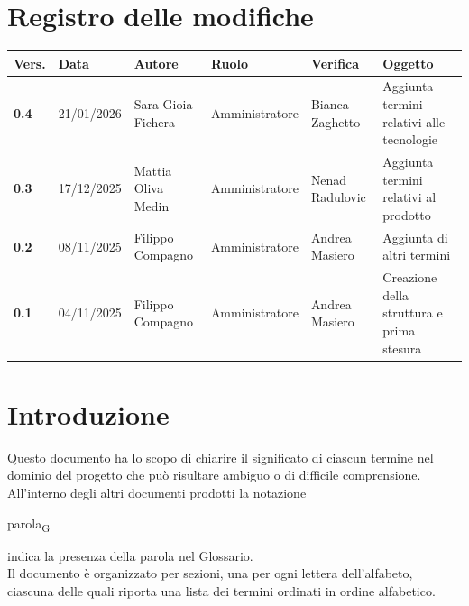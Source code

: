 \documentclass[a4paper,12pt]{article}
\begin{document}
    

        \newpage
        \section*{Registro delle modifiche} {
        \begin{table}[h!]
            \begin{tabularx}{\textwidth}{|l|l|l|l|L|L|}
                \hline
                \textbf{Vers.} & \textbf{Data} & \textbf{Autore} & \textbf{Ruolo} & \textbf{Verifica} & \textbf{Oggetto} \\
                \hline
                \textbf{0.4} & 21/01/2026 & Sara Gioia Fichera & Amministratore & Bianca Zaghetto & Aggiunta termini relativi alle tecnologie \\
                \hline
                \textbf{0.3} & 17/12/2025 & Mattia Oliva Medin & Amministratore & Nenad Radulovic & Aggiunta termini relativi al prodotto \\
                \hline
                \textbf{0.2} & 08/11/2025 & Filippo Compagno & Amministratore & Andrea Masiero & Aggiunta di altri termini \\
                \hline
                \textbf{0.1} & 04/11/2025 & Filippo Compagno & Amministratore & Andrea Masiero & Creazione della struttura e prima stesura \\
                \hline
            \end{tabularx}
            \end{table}
        }
        \newpage

        \tableofcontents
        \newpage

        \section*{Introduzione} {
            Questo documento ha lo scopo di chiarire il significato di ciascun termine nel dominio del progetto che può risultare ambiguo o di difficile comprensione.\\
            All'interno degli altri documenti prodotti la notazione
            \begin{center}
                parola\textsubscript{G}
            \end{center}
            indica la presenza della parola nel Glossario.\\
            Il documento è organizzato per sezioni, una per ogni lettera dell'alfabeto, ciascuna delle quali riporta una lista dei termini ordinati in ordine alfabetico.
        }
        \newpage
\end{document}
